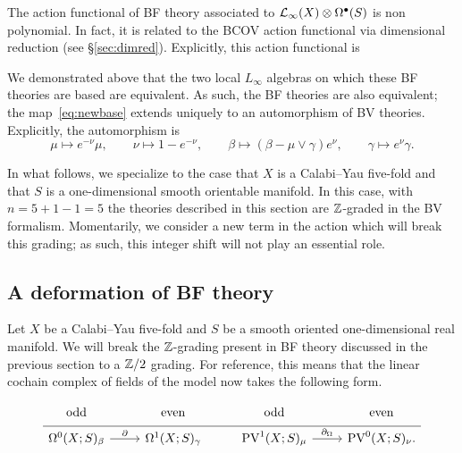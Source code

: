 The action functional of BF theory associated to $\mathcal L_\infty(X) \otimes \Omega^{\bullet}(S)$ is non polynomial. 
In fact, it is related to the BCOV action functional via dimensional reduction (see \S \ref{sec:dimred}).
Explicitly, this action functional is

We demonstrated above that the two local $L_\infty$ algebras on which these BF theories are based are equivalent. As such, the BF theories are also equivalent; the map~\eqref{eq:newbase} extends uniquely to an automorphism of BV theories.
Explicitly, the automorphism is
\begin{equation}\label{eqn:auto1}
  \mu \mapsto e^{-\nu} \mu, \qquad \nu \mapsto 1-e^{-\nu} , \qquad
  \beta \mapsto (\beta - \mu \vee \gamma) e^{\nu},\qquad \gamma \mapsto e^{\nu} \gamma .
\end{equation}

\parsec[]

In what follows, we specialize to the case that $X$ is a Calabi--Yau five-fold and that $S$ is a one-dimensional smooth orientable manifold. 
In this case, with $n = 5 + 1 - 1 = 5$ the theories described in this section are $\mathbb Z$-graded in the BV formalism.
Momentarily, we consider a new term in the action which will break this grading; as such, this integer shift will not play an essential role.

\subsection{A deformation of BF theory} 

Let $X$ be a Calabi--Yau five-fold and $S$ be a smooth oriented one-dimensional real manifold. 
We will break the $\mathbb Z$-grading present in BF theory discussed in the previous section to a $\mathbb Z/2$ grading. 
For reference, this means that the linear cochain complex of fields of the model now takes the following form. 

\begin{equation}
  \label{eq:sympfields} 
  \begin{tikzcd}[row sep = 1 ex]
    {\rm odd} & {\rm even} & {\rm odd} & {\rm even} \\ \hline
    \Omega^{0}(X;S)_\beta \ar[r, "\del"] & \Omega^{1}(X;S)_\gamma & 
     \PV^{1}(X; S)_\mu \ar[r, "\div"] & \PV^{0}(X; S)_\nu.
\end{tikzcd}
\end{equation}

